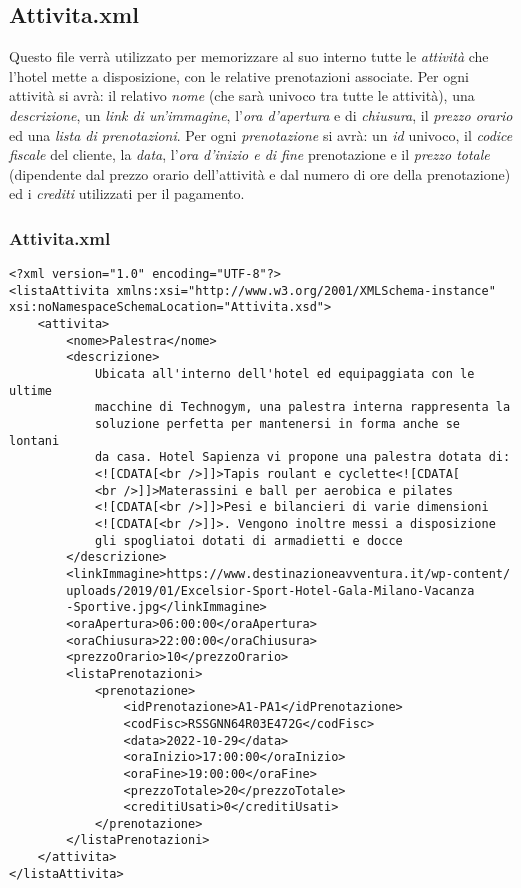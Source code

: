\documentclass [a4paper, 12pt]{book}
\begin{document}
\subsection{Attivita.xml}
Questo file verrà utilizzato per memorizzare al suo interno tutte le \textit{attività} che l'hotel mette a disposizione, con le relative prenotazioni associate. Per ogni attività si avrà: il relativo \textit{nome} (che sarà univoco tra tutte le attività), una \textit{descrizione}, un \textit{link di un'immagine}, l'\textit{ora d'apertura} e di \textit{chiusura}, il \textit{prezzo orario} ed una \textit{lista di prenotazioni}. Per ogni \textit{prenotazione} si avrà: un \textit{id} univoco, il \textit{codice fiscale} del cliente, la \textit{data}, l'\textit{ora d'inizio e di fine} prenotazione e il \textit{prezzo totale} (dipendente dal prezzo orario dell'attività e dal numero di ore della prenotazione) ed i \textit{crediti} utilizzati per il pagamento.

\subsubsection{Attivita.xml}
\begin{lstlisting}[style=XML]
<?xml version="1.0" encoding="UTF-8"?>
<listaAttivita xmlns:xsi="http://www.w3.org/2001/XMLSchema-instance" xsi:noNamespaceSchemaLocation="Attivita.xsd">
    <attivita>
        <nome>Palestra</nome>
        <descrizione>
            Ubicata all'interno dell'hotel ed equipaggiata con le ultime
            macchine di Technogym, una palestra interna rappresenta la
            soluzione perfetta per mantenersi in forma anche se lontani
            da casa. Hotel Sapienza vi propone una palestra dotata di:
            <![CDATA[<br />]]>Tapis roulant e cyclette<![CDATA[
            <br />]]>Materassini e ball per aerobica e pilates
            <![CDATA[<br />]]>Pesi e bilancieri di varie dimensioni
            <![CDATA[<br />]]>. Vengono inoltre messi a disposizione
            gli spogliatoi dotati di armadietti e docce
        </descrizione>
        <linkImmagine>https://www.destinazioneavventura.it/wp-content/
        uploads/2019/01/Excelsior-Sport-Hotel-Gala-Milano-Vacanza
        -Sportive.jpg</linkImmagine>
        <oraApertura>06:00:00</oraApertura>
        <oraChiusura>22:00:00</oraChiusura>
        <prezzoOrario>10</prezzoOrario>
        <listaPrenotazioni>
            <prenotazione>
            	<idPrenotazione>A1-PA1</idPrenotazione>
                <codFisc>RSSGNN64R03E472G</codFisc>
                <data>2022-10-29</data>
                <oraInizio>17:00:00</oraInizio>
                <oraFine>19:00:00</oraFine>
                <prezzoTotale>20</prezzoTotale>
                <creditiUsati>0</creditiUsati>
            </prenotazione>
        </listaPrenotazioni>
    </attivita>
</listaAttivita>
\end{lstlisting}
\end{document}
